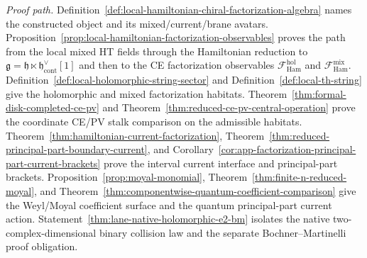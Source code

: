 \begin{stmt}
  \emph{Proof path.}
  Definition~\ref{def:local-hamiltonian-chiral-factorization-algebra}
  names the constructed object and its mixed/current/brane avatars.
  Proposition~\ref{prop:local-hamiltonian-factorization-observables}
  proves the path from the local mixed HT fields through the Hamiltonian
  reduction to
  \(\mathfrak g=\mathfrak h\ltimes
  \mathfrak h^\vee_{\mathrm{cont}}[1]\) and then to the CE
  factorization observables
  \(\mathcal F_{\mathrm{Ham}}^{\mathrm{hol}}\) and
  \(\mathcal F_{\mathrm{Ham}}^{\mathrm{mix}}\).
  Definition~\ref{def:local-holomorphic-string-sector} and
  Definition~\ref{def:local-th-string} give the holomorphic and mixed
  factorization habitats.  Theorem~\ref{thm:formal-disk-completed-ce-pv}
  and Theorem~\ref{thm:reduced-ce-pv-central-operation} prove the
  coordinate CE/PV stalk comparison on the admissible habitats.
  Theorem~\ref{thm:hamiltonian-current-factorization},
  Theorem~\ref{thm:reduced-principal-part-boundary-current}, and
  Corollary~\ref{cor:app-factorization-principal-part-current-brackets}
  prove the interval current interface and principal-part brackets.
  Proposition~\ref{prop:moyal-monomial},
  Theorem~\ref{thm:finite-n-reduced-moyal}, and
  Theorem~\ref{thm:componentwise-quantum-coefficient-comparison} give the Weyl/Moyal
  coefficient surface and the quantum principal-part current action.
  Statement~\ref{thm:lane-native-holomorphic-e2-bm} isolates the native
  two-complex-dimensional binary collision law and the separate
  Bochner--Martinelli proof obligation.


\end{stmt}
